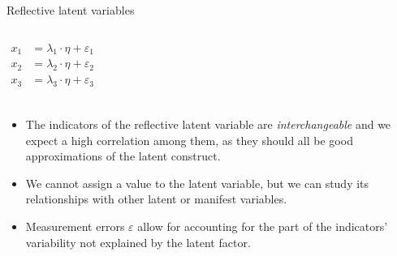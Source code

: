 \documentclass{beamer}
\begin{document}
\begin{frame}{Reflective latent variables}
    \begin{columns}
    \[
    \begin{aligned}
    x_1 &= \lambda_1 \cdot \eta + \varepsilon_1 \\
    x_2 &= \lambda_2 \cdot \eta + \varepsilon_2 \\
    x_3 &= \lambda_3 \cdot \eta + \varepsilon_3 \\
    \end{aligned}
    \]
    \end{columns}
    \vspace{1em}
    \pause
    \small
    \begin{itemize}
        \item The indicators of the reflective latent variable are \textit{interchangeable} and we expect a high correlation among them, as they should all be good approximations of the latent construct.
        \item We cannot assign a value to the latent variable, but we can study its relationships with other latent or manifest variables.
        \item Measurement errors $\varepsilon$ allow for accounting for the part of the indicators' variability not explained by the latent factor. 
    \end{itemize}
\end{frame}
\end{document}
